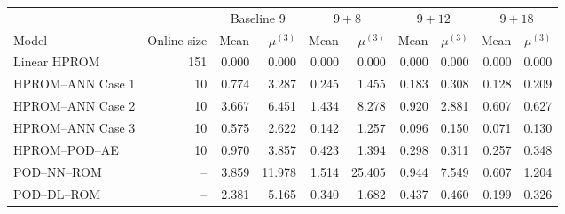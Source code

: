 \begin{tabular}{lr|rr|rr|rr|rr}
\toprule
\multicolumn{2}{c|}{} & \multicolumn{2}{c|}{Baseline 9} & \multicolumn{2}{c|}{$9+8$} & \multicolumn{2}{c|}{$9+12$} & \multicolumn{2}{c}{$9+18$} \\ Model & Online size & Mean & $\mu^{(3)}$ & Mean & $\mu^{(3)}$ & Mean & $\mu^{(3)}$ & Mean & $\mu^{(3)}$ \\
\midrule
Linear HPROM & 151 & 0.000 & 0.000 & 0.000 & 0.000 & 0.000 & 0.000 & 0.000 & 0.000 \\
HPROM--ANN Case 1 & 10 & 0.774 & 3.287 & 0.245 & 1.455 & 0.183 & 0.308 & 0.128 & 0.209 \\
HPROM--ANN Case 2 & 10 & 3.667 & 6.451 & 1.434 & 8.278 & 0.920 & 2.881 & 0.607 & 0.627 \\
HPROM--ANN Case 3 & 10 & 0.575 & 2.622 & 0.142 & 1.257 & 0.096 & 0.150 & 0.071 & 0.130 \\
HPROM--POD--AE & 10 & 0.970 & 3.857 & 0.423 & 1.394 & 0.298 & 0.311 & 0.257 & 0.348 \\
\midrule
POD--NN--ROM & -- & 3.859 & 11.978 & 1.514 & 25.405 & 0.944 & 7.549 & 0.607 & 1.204 \\
POD--DL--ROM & -- & 2.381 & 5.165 & 0.340 & 1.682 & 0.437 & 0.460 & 0.199 & 0.326 \\
\bottomrule
\end{tabular}

